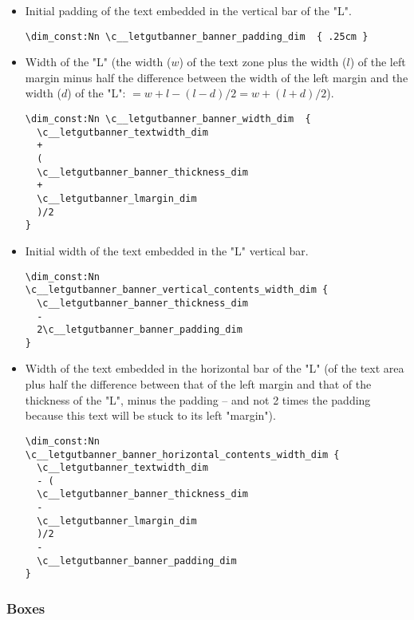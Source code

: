\documentclass{letgut}
\begin{document}
\begin{itemize}
\begin{itemize}
\begin{lstlisting}
\dim_if_exist:NTF \c__letgut_banner_height_dim {
  \dim_const:NV \c__letgutbanner_banner_height_dim
    \c__letgut_banner_height_dim
}{
  \dim_const:Nn \c__letgutbanner_banner_height_dim  {
    \c__letgutbanner_textheight_dim
    +
    3cm
  }
}
\end{lstlisting}
\item Initial padding of the text embedded in the vertical bar of the "L".
\begin{lstlisting}
\dim_const:Nn \c__letgutbanner_banner_padding_dim  { .25cm }
\end{lstlisting}
\item Width of the "L" (the width (\(w\)) of the text zone plus the width (\(l\)) of
the left margin minus half the difference between the width of the left
margin and the width (\(d\)) of the "L": \(=w+l-(l-d)/2=w+(l+d)/2\)).
\begin{lstlisting}
\dim_const:Nn \c__letgutbanner_banner_width_dim  {
  \c__letgutbanner_textwidth_dim
  +
  (
  \c__letgutbanner_banner_thickness_dim
  +
  \c__letgutbanner_lmargin_dim
  )/2
}
\end{lstlisting}
\item Initial width of the text embedded in the "L" vertical bar.
\begin{lstlisting}
\dim_const:Nn
\c__letgutbanner_banner_vertical_contents_width_dim {
  \c__letgutbanner_banner_thickness_dim
  -
  2\c__letgutbanner_banner_padding_dim
}
\end{lstlisting}
\item Width of the text embedded in the horizontal bar of the "L" (of the text
area plus half the difference between that of the left margin and that of
the thickness of the "L", minus the padding -- and not 2 times the
padding because this text will be stuck to its left "margin").
\begin{lstlisting}
\dim_const:Nn
\c__letgutbanner_banner_horizontal_contents_width_dim {
  \c__letgutbanner_textwidth_dim
  - (
  \c__letgutbanner_banner_thickness_dim
  -
  \c__letgutbanner_lmargin_dim
  )/2
  -
  \c__letgutbanner_banner_padding_dim
}
\end{lstlisting}
\end{itemize}
\end{itemize}

\subsubsection{Boxes}
\label{sec:orge5b5c6b}
\end{document}

